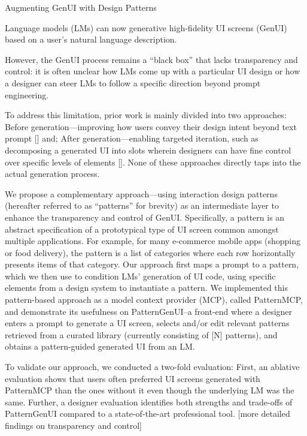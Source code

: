 Augmenting GenUI with Design Patterns

Language models (LMs) can now generative high-fidelity UI screens (GenUI) based on a user's natural language description.

However, the GenUI process remains a ``black box'' that lacks transparency and control: it is often unclear how LMs come up with a particular UI design or how a designer can steer LMs to follow a specific direction beyond prompt engineering.

To address this limitation, prior work is mainly divided into two approaches:
\one Before generation---improving how users convey their design intent beyond text prompt [\xx] and;
\two After generation---enabling targeted iteration, such as decomposing a generated UI into slots wherein designers can have fine control over specific levels of elements [\xx].
None of these approaches directly taps into the actual generation process.

We propose a complementary approach---using interaction design patterns (hereafter referred to as ``patterns'' for brevity) as an intermediate layer to enhance the transparency and control of GenUI.
Specifically, a pattern is an abstract specification of a prototypical type of UI screen common amongst multiple applications. For example, for many e-commerce mobile apps (\eg shopping or food delivery), the pattern is a list of categories where each row horizontally presents items of that category.
Our approach first maps a prompt to a pattern, which we then use to condition LMs' generation of UI code, \eg using specific elements from a design system to instantiate a pattern.
We implemented this pattern-based approach as a model context provider (MCP), called PatternMCP, and demonstrate its usefulness on PatternGenUI--a front-end where a designer enters a prompt to generate a UI screen, selects and/or edit relevant patterns retrieved from a curated library (currently consisting of [N] patterns), and obtains a pattern-guided generated UI from an LM.

To validate our approach, we conducted a two-fold evaluation:
First, an ablative evaluation shows that users often preferred UI screens generated with PatternMCP than the ones without it even though the underlying LM was the same.
Further, a designer evaluation identifies both strengths and trade-offs of PatternGenUI compared to a state-of-the-art professional tool. [more detailed findings on transparency and control]
